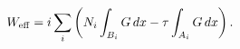 \begin{equation}
  \label{eq:Weff}
  W_{\rm eff}= 
i \sum_i \left( N_i \int_{B_i} G\, dx - 
    \tau \int_{A_i} G\, dx \right).
\end{equation}

